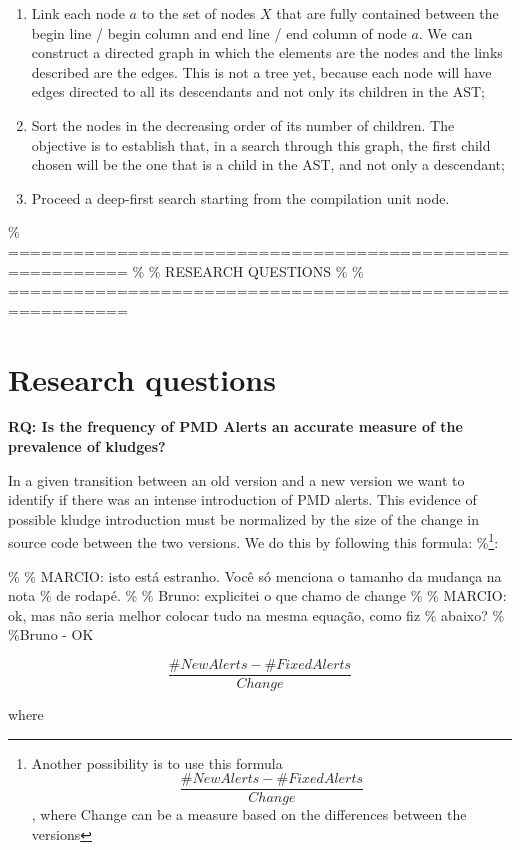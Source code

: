 \documentclass[
]{article}
\begin{document}
\begin{enumerate}
\item
  Link each node \(a\) to the set of nodes \(X\) that are fully
  contained between the begin line / begin column and end line / end
  column of node \(a\). We can construct a directed graph in which
  the elements are the nodes and the links described are the edges. This
  is not a tree yet, because each node will have edges directed to all
  its descendants and not only its children in the AST;

\item
  Sort the nodes in the decreasing order of its number of children. The
  objective is to establish that, in a search through this graph, the
  first child chosen will be the one that is a child in the AST, and not
  only a descendant;

\item
  Proceed a deep-first search starting from the compilation unit node.
\end{enumerate}

\% ========================================================= \% \%
RESEARCH QUESTIONS \% \%
=========================================================

\section{Research questions}
\label{as_whole}

\noindent
\textbf{RQ: Is the frequency of PMD Alerts an accurate measure of the prevalence of kludges?}
\label{PMD_Kludge}

In a given transition between an old version and a new version we want
to identify if there was an intense introduction of PMD alerts. This
evidence of possible kludge introduction must be normalized by the size
of the change in source code between the two versions. We do this by
following this formula:
\%\footnote{Another possibility is to use this formula \[ \frac{\#NewAlerts - \#FixedAlerts}{Change}    \], where Change can be a measure based on the differences between the versions}:

\% \% MARCIO: isto está estranho. Você só menciona o tamanho da mudança
na nota \% de rodapé. \% \% Bruno: explicitei o que chamo de change \%
\% MARCIO: ok, mas não seria melhor colocar tudo na mesma equação, como
fiz \% abaixo? \% \%Bruno - OK

\[ \frac{\#NewAlerts - \#FixedAlerts}{Change}    \]

where
\end{document}
